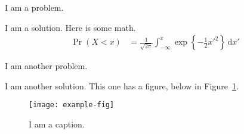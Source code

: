 \documentclass[submit]{harvardml}
\begin{document}
\begin{problem}[5pts]
I am a problem.
\end{problem}

I am a solution.  Here is some math.
\begin{align}
  \Pr(X < x) &= \frac{1}{\sqrt{2\pi}}\int_{-\infty}^x\exp\left\{-\frac{1}{2}x'^2\right\}\,\mathrm{d}x'
\end{align}

\begin{problem}[15pts]
I am another problem.
\end{problem}

I am another solution.  This one has a figure, below in Figure~\ref{fig}.
\begin{figure}[h]
  \centering
  \texttt{[image: example-fig]}
  \caption{I am a caption.}
  \label{fig}
\end{figure}
\end{document}
